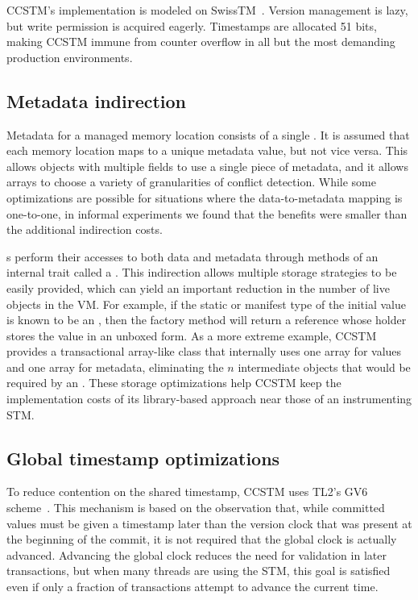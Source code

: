 
CCSTM's implementation is modeled on SwissTM~\cite{swisstm}.  Version
management is lazy, but write permission is acquired eagerly.  Timestamps
are allocated 51 bits, making CCSTM immune from counter overflow in all
but the most demanding production environments.

\subsection{Metadata indirection}

Metadata for a managed memory location consists of a single .
It is assumed that each memory location maps to a unique metadata value, but
not vice versa.  This allows objects with multiple fields to use
a single piece of metadata, and it allows arrays to choose a variety of
granularities of conflict detection.  While some optimizations are possible for
situations where the data-to-metadata mapping is one-to-one, in informal
experiments we found that the benefits were smaller than the additional
indirection costs.

s perform their accesses to both data and metadata through
methods of an internal trait called a .  This indirection
allows multiple storage strategies to be easily provided, which can
yield an important reduction in the number of live objects in the VM.
For example, if the static or manifest type of the initial value is known
to be an , then the  factory method will return
a reference whose holder stores the value in an unboxed form.  As a
more extreme example, CCSTM provides a transactional array-like class
that internally uses one array for values and one array for metadata,
eliminating the $n$ intermediate objects that would be required by an
.  These storage optimizations help CCSTM
keep the implementation costs of its library-based approach near those
of an instrumenting STM.

\subsection{Global timestamp optimizations}

To reduce contention on the shared timestamp, CCSTM uses TL2's GV6
scheme~\cite{dice06tl2}.  This mechanism is based on the observation
that, while committed values must be given a timestamp later than the
version clock that was present at the beginning of the commit, it is
not required that the global clock is actually advanced.  Advancing the
global clock reduces the need for validation in later transactions,
but when many threads are using the STM, this goal is satisfied even if
only a fraction of transactions attempt to advance the current time.

